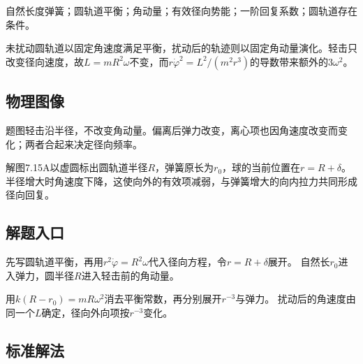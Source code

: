 \documentclass[UTF8,fontset=fandol,a4paper,11pt]{ctexart}
\begin{document}
自然长度弹簧；圆轨道平衡；角动量；有效径向势能；一阶回复系数；圆轨道存在条件。

未扰动圆轨道以固定角速度满足平衡，扰动后的轨迹则以固定角动量演化。轻击只改变径向速度，故$L=mR^2\omega$不变，而$r\dot\varphi^2=L^2/(m^2r^3)$的导数带来额外的$3\omega^2$。




\subsection*{物理图像}

题图轻击沿半径，不改变角动量。偏离后弹力改变，离心项也因角速度改变而变化；两者合起来决定径向频率。

解图7.15A以虚圆标出圆轨道半径$R$，弹簧原长为$r_0$，球的当前位置在$r=R+\delta$。半径增大时角速度下降，这使向外的有效项减弱，与弹簧增大的向内拉力共同形成径向回复。




\subsection*{解题入口}

先写圆轨道平衡，再用$r^2\dot\varphi=R^2\omega$代入径向方程，令$r=R+\delta$展开。
自然长$r_0$进入弹力，圆半径$R$进入轻击前的角动量。

用$k(R-r_0)=mR\omega^2$消去平衡常数，再分别展开$r^{-3}$与弹力。
扰动后的角速度由同一个$L$确定，径向外向项按$r^{-3}$变化。



\subsection*{标准解法}
\end{document}
